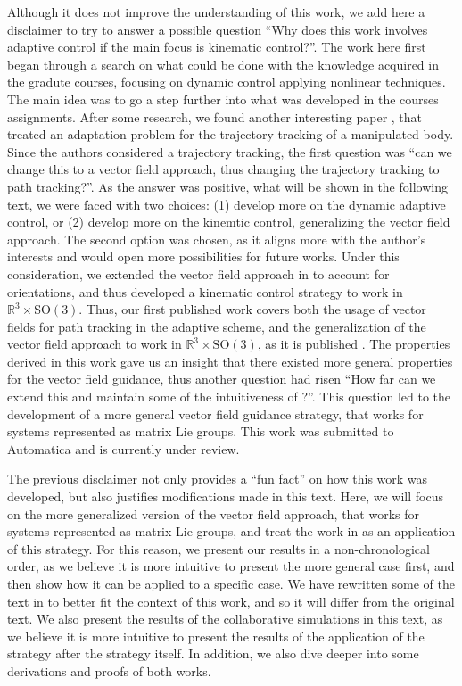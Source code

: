Although it does not improve the understanding of this work, we add here a disclaimer to try to answer a possible question ``Why does this work involves adaptive control if the main focus is kinematic control?''. The work here first began through a search on what could be done with the knowledge acquired in the gradute courses, focusing on dynamic control applying nonlinear techniques. The main idea was to go a step further into what was developed in the courses assignments. After some research, we found another interesting paper \citep{Culbertson2021}, that treated an adaptation problem for the trajectory tracking of a manipulated body. Since the authors considered a trajectory tracking, the first question was ``can we change this to a vector field approach, thus changing the trajectory tracking to path tracking?''. As the answer was positive, what will be shown in the following text, we were faced with two choices: (1) develop more on the dynamic adaptive control, or (2) develop more on the kinemtic control, generalizing the vector field approach. The second option was chosen, as it aligns more with the author's interests and would open more possibilities for future works. Under this consideration, we extended the vector field approach in \citet{Rezende2022} to account for orientations, and thus developed a kinematic control strategy to work in $\mathbb{R}^3\times\text{SO}(3)$. Thus, our first published work covers both the usage of vector fields for path tracking in the adaptive scheme, and the generalization of the vector field approach to work in $\mathbb{R}^3\times\text{SO}(3)$, as it is published \citep{Pessoa2024}. The properties derived in this work gave us an insight that there existed more general properties for the vector field guidance, thus another question had risen ``How far can we extend this and maintain some of the intuitiveness of \citet{Rezende2022}?''. This question led to the development of a more general vector field guidance strategy, that works for systems represented as matrix Lie groups. This work was submitted to Automatica and is currently under review.

The previous disclaimer not only provides a ``fun fact'' on how this work was developed, but also justifies modifications made in this text. Here, we will focus on the more generalized version of the vector field approach, that works for systems represented as matrix Lie groups, and treat the work in \citet{Pessoa2024} as an application of this strategy. For this reason, we present our results in a non-chronological order, as we believe it is more intuitive to present the more general case first, and then show how it can be applied to a specific case. We have rewritten some of the text in \citet{Pessoa2024} to better fit the context of this work, and so it will differ from the original text. We also present the results of the collaborative simulations in this text, as we believe it is more intuitive to present the results of the application of the strategy after the strategy itself. In addition, we also dive deeper into some derivations and proofs of both works.
